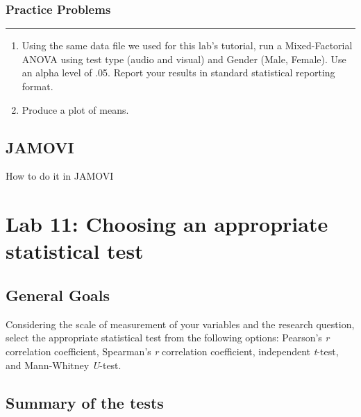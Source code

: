\documentclass[
]{book}
\begin{document}
\hypertarget{practice-problems-8}{%
\subsection{Practice Problems}\label{practice-problems-8}}

\begin{center}\rule{0.5\linewidth}{0.5pt}\end{center}

\begin{enumerate}
\def\labelenumi{\arabic{enumi}.}
\item
  Using the same data file we used for this lab's tutorial, run a Mixed-Factorial ANOVA using test type (audio and visual) and Gender (Male, Female). Use an alpha level of .05. Report your results in standard statistical reporting format.
\item
  Produce a plot of means.
\end{enumerate}

\hypertarget{jamovi-3}{%
\section{JAMOVI}\label{jamovi-3}}

How to do it in JAMOVI

\hypertarget{lab-11-choosing-an-appropriate-statistical-test}{%
\chapter{Lab 11: Choosing an appropriate statistical test}\label{lab-11-choosing-an-appropriate-statistical-test}}

\hypertarget{general-goals-3}{%
\section{General Goals}\label{general-goals-3}}

Considering the scale of measurement of your variables and the research question, select the appropriate statistical test from the following options: Pearson's \emph{r} correlation coefficient, Spearman's \emph{r} correlation coefficient, independent \emph{t}-test, and Mann-Whitney \emph{U}-test.

\hypertarget{summary-of-the-tests}{%
\section{Summary of the tests}\label{summary-of-the-tests}}
\end{document}
